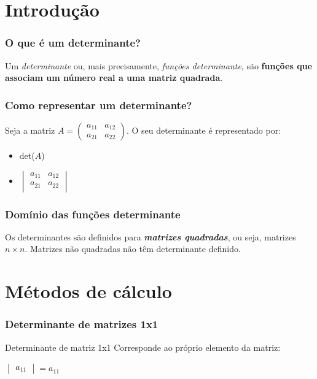 \documentclass[pdftex, brazil]{beamer}
\begin{document}
\section{Introdução}

\begin{frame}[t]
  \frametitle{O que é um determinante?}
  Um \emph{determinante} ou, mais precisamente, \emph{funções determinante}, são
  \textbf{funções que associam um número real a uma matriz quadrada}.
\end{frame}

\begin{frame}[t]
  \frametitle{Como representar um determinante?}
  Seja a matriz $A = \begin{pmatrix}
a_{11} & a_{12}\\
a_{21} & a_{22}\end{pmatrix}$. O seu determinante é representado por:
  \vspace{1cm}
  \begin{itemize}
    \item det($A$)
    \item $\begin{vmatrix}
      a_{11} & a_{12}\\
      a_{21} & a_{22}\\
      \end{vmatrix}$
  \end{itemize}
\end{frame}

\begin{frame}[t]
  \frametitle{Domínio das funções determinante}
  Os determinantes são definidos para \emph{\textbf{matrizes quadradas}}, ou
  seja, matrizes $n \times n$. Matrizes não quadradas não têm determinante
  definido.
\end{frame}


\section{Métodos de cálculo}

\begin{frame}[t]
  \frametitle{Determinante de matrizes 1x1}
  \begin{block}{Determinante de matriz 1x1}
    Corresponde ao próprio elemento da matriz:
    \begin{center}
    $\begin{vmatrix}
      a_{11}\end{vmatrix} = a_{11}$
    \end{center}
  \end{block}
\end{frame}
\end{document}
